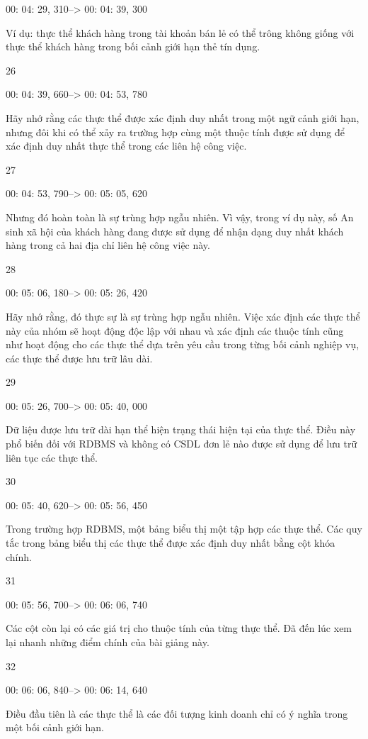 00: 04: 29, 310--> 00: 04: 39, 300

Ví dụ: thực thể khách hàng trong tài khoản bán lẻ có thể trông không giống với thực thể khách hàng trong bối cảnh giới hạn thẻ tín dụng.

26

00: 04: 39, 660--> 00: 04: 53, 780

Hãy nhớ rằng các thực thể được xác định duy nhất trong một ngữ cảnh giới hạn, nhưng đôi khi có thể xảy ra trường hợp cùng một thuộc tính được sử dụng để xác định duy nhất thực thể trong các liên hệ công việc.

27

00: 04: 53, 790--> 00: 05: 05, 620

Nhưng đó hoàn toàn là sự trùng hợp ngẫu nhiên. Vì vậy, trong ví dụ này, số An sinh xã hội của khách hàng đang được sử dụng để nhận dạng duy nhất khách hàng trong cả hai địa chỉ liên hệ công việc này.

28

00: 05: 06, 180--> 00: 05: 26, 420

Hãy nhớ rằng, đó thực sự là sự trùng hợp ngẫu nhiên. Việc xác định các thực thể này của nhóm sẽ hoạt động độc lập với nhau và xác định các thuộc tính cũng như hoạt động cho các thực thể dựa trên yêu cầu trong từng bối cảnh nghiệp vụ, các thực thể được lưu trữ lâu dài.

29

00: 05: 26, 700--> 00: 05: 40, 000

Dữ liệu được lưu trữ dài hạn thể hiện trạng thái hiện tại của thực thể. Điều này phổ biến đối với RDBMS và không có CSDL đơn lẻ nào được sử dụng để lưu trữ liên tục các thực thể.

30

00: 05: 40, 620--> 00: 05: 56, 450

Trong trường hợp RDBMS, một bảng biểu thị một tập hợp các thực thể. Các quy tắc trong bảng biểu thị các thực thể được xác định duy nhất bằng cột khóa chính.

31

00: 05: 56, 700--> 00: 06: 06, 740

Các cột còn lại có các giá trị cho thuộc tính của từng thực thể. Đã đến lúc xem lại nhanh những điểm chính của bài giảng này.

32

00: 06: 06, 840--> 00: 06: 14, 640

Điều đầu tiên là các thực thể là các đối tượng kinh doanh chỉ có ý nghĩa trong một bối cảnh giới hạn.

